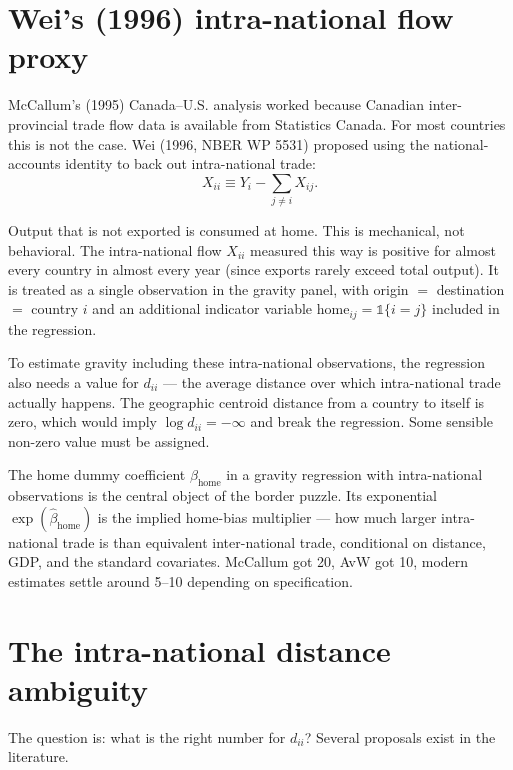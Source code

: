 \documentclass[11pt,letterpaper,oneside]{book}
\theoremstyle{definition}
\theoremstyle{remark}
\begin{document}
\section{Wei's (1996) intra-national flow proxy}

McCallum's (1995) Canada--U.S. analysis worked because Canadian inter-provincial trade flow data is available from Statistics Canada. For most countries this is not the case. Wei (1996, NBER WP 5531) proposed using the national-accounts identity to back out intra-national trade:
\begin{equation}
X_{ii} \equiv Y_i - \sum_{j \neq i} X_{ij}.
\label{eq:wei-proxy}
\end{equation}

Output that is not exported is consumed at home. This is mechanical, not behavioral. The intra-national flow $X_{ii}$ measured this way is positive for almost every country in almost every year (since exports rarely exceed total output). It is treated as a single observation in the gravity panel, with origin $=$ destination $=$ country $i$ and an additional indicator variable $\text{home}_{ij} = \mathbb{1}\{i = j\}$ included in the regression.

To estimate gravity including these intra-national observations, the regression also needs a value for $d_{ii}$ --- the average distance over which intra-national trade actually happens. The geographic centroid distance from a country to itself is zero, which would imply $\log d_{ii} = -\infty$ and break the regression. Some sensible non-zero value must be assigned.

\begin{tcolorbox}[insight]
The home dummy coefficient $\beta_{\text{home}}$ in a gravity regression with intra-national observations is the central object of the border puzzle. Its exponential $\exp(\hat\beta_{\text{home}})$ is the implied home-bias multiplier --- how much larger intra-national trade is than equivalent inter-national trade, conditional on distance, GDP, and the standard covariates. McCallum got 20, AvW got 10, modern estimates settle around 5--10 depending on specification.
\end{tcolorbox}

\section{The intra-national distance ambiguity}

The question is: what is the right number for $d_{ii}$? Several proposals exist in the literature.
\end{document}
